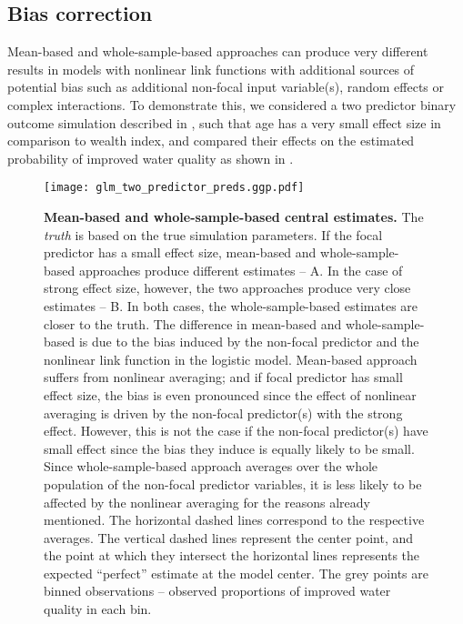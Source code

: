 \subsection{Bias correction}

Mean-based and whole-sample-based approaches can produce very different results in models with nonlinear link functions with additional sources of potential bias such as additional non-focal input variable(s), random effects or complex interactions. To demonstrate this, we considered a two predictor binary outcome simulation described in , such that age has a very small effect size in comparison to wealth index, and compared their effects on the estimated probability of improved water quality as shown in . 

\begin{figure}
\begin{center}
\texttt{[image: glm\_two\_predictor\_preds.ggp.pdf]}
\end{center}
\caption{{\bf Mean-based and whole-sample-based central estimates.} The \emph{truth} is based on the true simulation parameters. If the focal predictor has a small effect size, mean-based and whole-sample-based approaches produce different estimates -- A. In the case of strong effect size, however, the two approaches produce very close estimates -- B. In both cases, the whole-sample-based estimates are closer to the truth. The difference in mean-based and whole-sample-based is due to the bias induced by the non-focal predictor and the nonlinear link function in the logistic model. Mean-based approach suffers from nonlinear averaging; and if focal predictor has small effect size, the bias is even pronounced since the effect of nonlinear averaging is driven by the non-focal predictor(s) with the strong effect. However, this is not the case if the non-focal predictor(s) have small effect since the bias they induce is equally likely to be small. Since whole-sample-based approach averages over the whole population of the non-focal predictor variables, it is less likely to be affected by the nonlinear averaging for the reasons already mentioned. The horizontal dashed lines correspond to the respective averages. The vertical dashed lines represent the center point, and the point at which they intersect the horizontal lines represents the expected ``perfect'' estimate at the model center. The grey points are binned observations -- observed proportions of improved water quality in each bin.} 
\label{fig:pred_bin_plots}
\end{figure}

